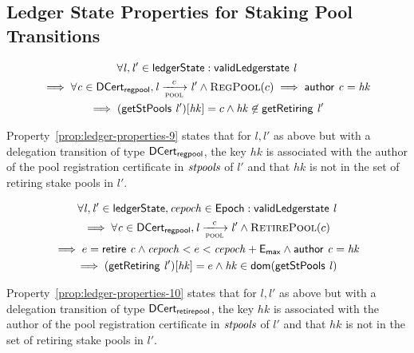 \subsection{Ledger State Properties for Staking Pool Transitions}
\label{sec:ledg-state-prop}

\begin{property}
  \begin{multline*}
    \forall \var{l}, \var{l'} \in \ledgerState: \applyFun{validLedgerstate}{l}\\
    \implies \forall \var{c} \in \DCertRegPool, \var{l} \trans{pool}{c} \var{l'}
    \wedge \RegPool{c} \implies \applyFun{author}{c} = \var{hk}\\ \implies
    (\applyFun{getStPools}{l'})[\var{hk}] = c \wedge \var{hk} \not\in
    \applyFun{getRetiring}{l'}
  \end{multline*}
  \label{prop:ledger-properties-9}
\end{property}

Property~\ref{prop:ledger-properties-9} states that for $l, l'$ as above but
with a delegation transition of type $\mathsf{DCert_{regpool}}$, the key $hk$ is associated
with the author of the pool registration certificate in $\mathit{stpools}$ of $l'$
and that $hk$ is not in the set of retiring stake pools in $l'$.

\begin{property}
  \begin{multline*}
    \forall \var{l}, \var{l'} \in \ledgerState, \var{cepoch} \in \Epoch:
    \applyFun{validLedgerstate}{l} \\
    \implies \forall \var{c} \in \DCertRegPool, \var{l} \trans{pool}{c} \var{l'}
    \wedge \RetirePool{c} \\ \implies e = \applyFun{retire}{c} \wedge
    \var{cepoch} < e < \var{cepoch} + \emax \wedge \applyFun{author}{c} =
    \var{hk}\\ \implies (\applyFun{getRetiring}{l'})[\var{hk}] = e \wedge
    \var{hk} \in \fun{dom}(\applyFun{getStPools}{l})
  \end{multline*}
  \label{prop:ledger-properties-10}
\end{property}

Property~\ref{prop:ledger-properties-10} states that for $l, l'$ as above but
with a delegation transition of type $\mathsf{DCert_{retirepool}}$, the key $hk$ is
associated with the author of the pool registration certificate in
$\mathit{stpools}$ of $l'$ and that $hk$ is not in the set of retiring stake pools
in $l'$.

